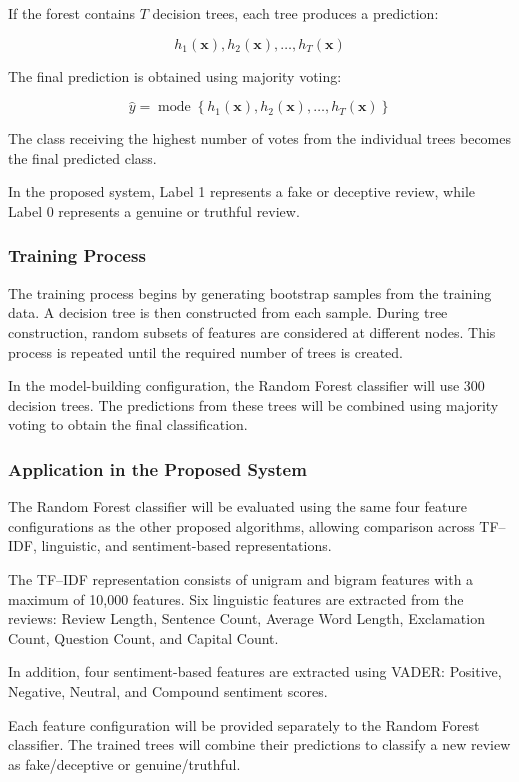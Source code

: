 \documentclass[12pt,a4paper]{report}
\begin{document}
If the forest contains \(T\) decision trees, each tree produces a prediction:

\[
h_1(\mathbf{x}),h_2(\mathbf{x}),\ldots,h_T(\mathbf{x})
\]

The final prediction is obtained using majority voting:

\[
\hat{y}
=
\operatorname{mode}
\left\{
h_1(\mathbf{x}),
h_2(\mathbf{x}),
\ldots,
h_T(\mathbf{x})
\right\}
\]

The class receiving the highest number of votes from the individual trees becomes the final predicted class.

In the proposed system, Label 1 represents a fake or deceptive review, while Label 0 represents a genuine or truthful review.

\subsubsection*{Training Process}

The training process begins by generating bootstrap samples from the training data. A decision tree is then constructed from each sample. During tree construction, random subsets of features are considered at different nodes. This process is repeated until the required number of trees is created.

In the model-building configuration, the Random Forest classifier will use 300 decision trees. The predictions from these trees will be combined using majority voting to obtain the final classification.

\subsubsection*{Application in the Proposed System}

The Random Forest classifier will be evaluated using the same four feature configurations as the other proposed algorithms, allowing comparison across TF--IDF, linguistic, and sentiment-based representations.

The TF--IDF representation consists of unigram and bigram features with a maximum of 10,000 features. Six linguistic features are extracted from the reviews: Review Length, Sentence Count, Average Word Length, Exclamation Count, Question Count, and Capital Count.

In addition, four sentiment-based features are extracted using VADER: Positive, Negative, Neutral, and Compound sentiment scores.

Each feature configuration will be provided separately to the Random Forest classifier. The trained trees will combine their predictions to classify a new review as fake/deceptive or genuine/truthful.
\end{document}
